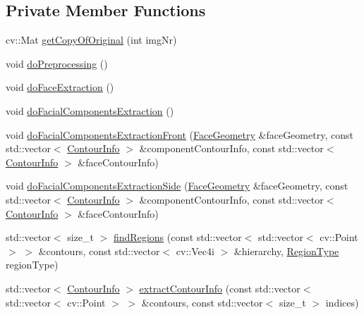 \subsection*{Private Member Functions}
\begin{DoxyCompactItemize}
\item 
cv\+::\+Mat \hyperlink{class_face3_d_1_1_detection_ad151547c47b89dc4673c51c43e22b6d3}{get\+Copy\+Of\+Original} (int img\+Nr)
\item 
void \hyperlink{class_face3_d_1_1_detection_a0b4b0034dd25890ac492854d825c3ea1}{do\+Preprocessing} ()
\item 
void \hyperlink{class_face3_d_1_1_detection_a424c3fba1ee4b7d24a84edebca9ecf14}{do\+Face\+Extraction} ()
\item 
void \hyperlink{class_face3_d_1_1_detection_a2345b11759e84ca94409cb65cef557f3}{do\+Facial\+Components\+Extraction} ()
\item 
void \hyperlink{class_face3_d_1_1_detection_aeca140a4cb5eb2d035afabd66b90b42c}{do\+Facial\+Components\+Extraction\+Front} (\hyperlink{class_face3_d_1_1_face_geometry}{Face\+Geometry} \&face\+Geometry, const std\+::vector$<$ \hyperlink{struct_face3_d_1_1_detection_1_1_contour_info}{Contour\+Info} $>$ \&component\+Contour\+Info, const std\+::vector$<$ \hyperlink{struct_face3_d_1_1_detection_1_1_contour_info}{Contour\+Info} $>$ \&face\+Contour\+Info)
\item 
void \hyperlink{class_face3_d_1_1_detection_ae630778f107162e95580608fcb87aedc}{do\+Facial\+Components\+Extraction\+Side} (\hyperlink{class_face3_d_1_1_face_geometry}{Face\+Geometry} \&face\+Geometry, const std\+::vector$<$ \hyperlink{struct_face3_d_1_1_detection_1_1_contour_info}{Contour\+Info} $>$ \&component\+Contour\+Info, const std\+::vector$<$ \hyperlink{struct_face3_d_1_1_detection_1_1_contour_info}{Contour\+Info} $>$ \&face\+Contour\+Info)
\item 
std\+::vector$<$ size\+\_\+t $>$ \hyperlink{class_face3_d_1_1_detection_a2685b94451caa0572d6d209c936160b4}{find\+Regions} (const std\+::vector$<$ std\+::vector$<$ cv\+::\+Point $>$ $>$ \&contours, const std\+::vector$<$ cv\+::\+Vec4i $>$ \&hierarchy, \hyperlink{class_face3_d_1_1_detection_a8db79da2a4506aa0e799e4ff098d7d62}{Region\+Type} region\+Type)
\item 
std\+::vector$<$ \hyperlink{struct_face3_d_1_1_detection_1_1_contour_info}{Contour\+Info} $>$ \hyperlink{class_face3_d_1_1_detection_ae9ca9a340a1f81db0fa240045da86017}{extract\+Contour\+Info} (const std\+::vector$<$ std\+::vector$<$ cv\+::\+Point $>$ $>$ \&contours, const std\+::vector$<$ size\+\_\+t $>$ indices)

\end{DoxyCompactItemize}
